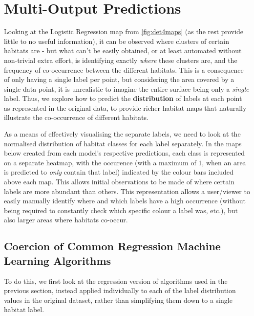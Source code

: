 \section{Multi-Output Predictions} 
Looking at the Logistic Regression map from \autoref{fig:det4maps} (as the rest provide little to no useful information), it can be observed where clusters of certain habitats are - but what can't be easily obtained, or at least automated without non-trivial extra effort, is identifying exactly \textit{where} these clusters are, and the frequency of co-occurrence between the different habitats. This is a consequence of only having a single label per point, but considering the area covered by a single data point, it is unrealistic to imagine the entire surface being only a \textit{single} label. Thus, we explore how to predict the \textbf{distribution} of labels at each point as represented in the original data, to provide richer habitat maps that naturally illustrate the co-occurrence of different habitats.

As a means of effectively visualising the separate labels, we need to look at the normalised distribution of habitat classes for each label separately. In the maps below created from each model's respective predictions, each class is represented on a separate heatmap, with the occurence (with a maximum of $1$, when an area is predicted to \textit{only} contain that label) indicated by the colour bars included above each map. This allows initial observations to be made of where certain labels are more abundant than others. This representation allows a user/viewer to easily manually identify where and which labels have a high occurrence (without being required to constantly check which specific colour a label was, etc.), but also larger areas where habitats co-occur.

\subsection{Coercion of Common Regression Machine Learning Algorithms} \label{ss:commonMLcoercion}
To do this, we first look at the regression version of algorithms used in the previous section, instead applied individually to each of the label distribution values in the original dataset, rather than simplifying them down to a single habitat label. 

